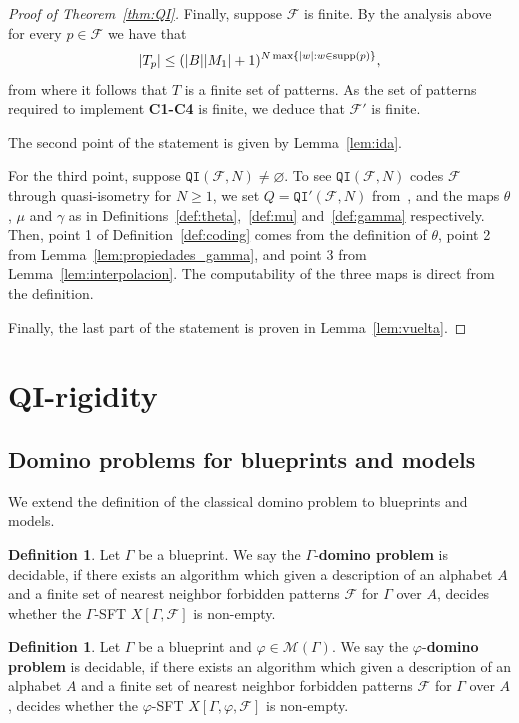 \documentclass{article}
\theoremstyle{definition}
\newtheorem{defn}[theorem]{Definition} %
\theoremstyle{definition}
\newcommand{\M}{\mathcal{M}}
\newcommand{\FF}{\mathcal{F}}
\newcommand{\Fo}{\mathcal{F}}
\newcommand{\QI}{\mathtt{QI}}
\newcommand{\supp}{\textnormal{supp}}
\newcommand{\define}[1]{\textbf{#1}}
\begin{document}
\begin{proof}[Proof of Theorem~\ref{thm:QI}]
Finally, suppose $\Fo$ is finite. By the analysis above for every $p \in \Fo$ we have that \[|T_p|\leq  (|B||M_1|+1)^{N\max\{|w|: w \in \supp(p)\}},\] from where it follows that $T$ is a finite set of patterns. As the set of patterns required to implement \textbf{C1-C4} is finite, we deduce that $\FF'$ is finite.

The second point of the statement is given by Lemma~\ref{lem:ida}.

For the third point, suppose $\QI(\Fo,N)\neq \varnothing$. To see $\QI(\Fo,N)$ codes $\Fo$ through quasi-isometry for $N\geq 1$, we set $Q = \QI'(\Fo, N)$ from~, and the maps $\theta$, $\mu$ and $\gamma$ as in Definitions~\ref{def:theta},~\ref{def:mu} and~\ref{def:gamma} respectively. Then, point 1 of Definition~\ref{def:coding} comes from the definition of $\theta$, point 2 from Lemma~\ref{lem:propiedades_gamma}, and point 3 from Lemma~\ref{lem:interpolacion}. The computability of the three maps is direct from the definition.

Finally, the last part of the statement is proven in Lemma~\ref{lem:vuelta}. 
\end{proof}



\section{QI-rigidity}
\label{sec:qi_rigidity}

\subsection{Domino problems for blueprints and models}

We extend the definition of the classical domino problem to blueprints and models.



\begin{defn}
 Let $\Gamma$ be a blueprint. We say the $\Gamma$-\define{domino problem} is decidable, if there exists an algorithm which given a description of an alphabet $A$ and a finite set of nearest neighbor forbidden patterns $\Fo$ for $\Gamma$ over $A$, decides whether the $\Gamma$-SFT $X[\Gamma,\Fo]$ is non-empty.
\end{defn}

\begin{defn}
 Let $\Gamma$ be a blueprint and $\varphi \in \M(\Gamma)$. We say the $\varphi$-\define{domino problem} is decidable, if there exists an algorithm which given a description of an alphabet $A$ and a finite set of nearest neighbor forbidden patterns $\Fo$ for $\Gamma$ over $A$, decides whether the $\varphi$-SFT $X[\Gamma,\varphi,\Fo]$ is non-empty.
\end{defn}
\end{document}
